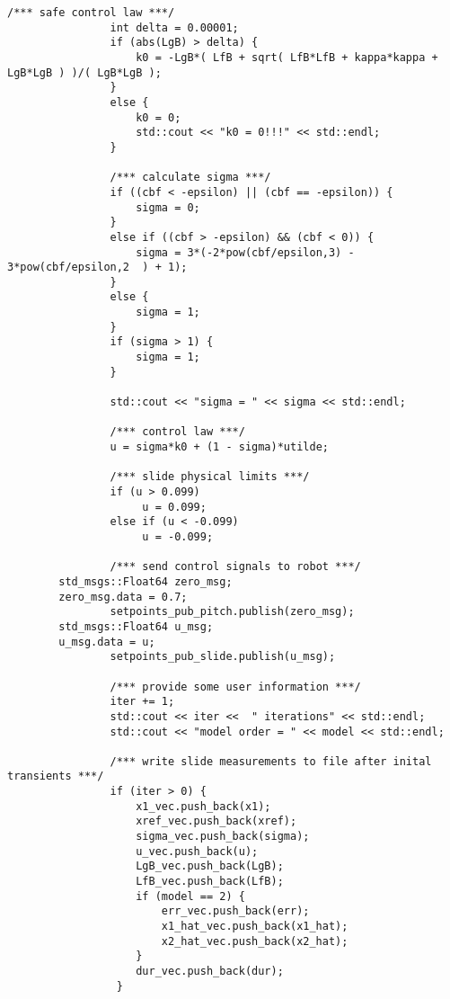 \begin{lstlisting}[language=gedit]
                /*** safe control law ***/
                int delta = 0.00001;
                if (abs(LgB) > delta) {
                    k0 = -LgB*( LfB + sqrt( LfB*LfB + kappa*kappa + LgB*LgB ) )/( LgB*LgB );
                }
                else {
                    k0 = 0;
                    std::cout << "k0 = 0!!!" << std::endl;
                }          
 
                /*** calculate sigma ***/
                if ((cbf < -epsilon) || (cbf == -epsilon)) {
                    sigma = 0;
                }
                else if ((cbf > -epsilon) && (cbf < 0)) {
                    sigma = 3*(-2*pow(cbf/epsilon,3) - 3*pow(cbf/epsilon,2	) + 1);
                }
                else {
                    sigma = 1;
                }
                if (sigma > 1) {
                    sigma = 1;
                }
               
                std::cout << "sigma = " << sigma << std::endl;

                /*** control law ***/
                u = sigma*k0 + (1 - sigma)*utilde;

                /*** slide physical limits ***/
                if (u > 0.099)
                     u = 0.099;
                else if (u < -0.099)
                     u = -0.099;
                
                /*** send control signals to robot ***/
		std_msgs::Float64 zero_msg;
		zero_msg.data = 0.7;
                setpoints_pub_pitch.publish(zero_msg);
		std_msgs::Float64 u_msg;
		u_msg.data = u;
                setpoints_pub_slide.publish(u_msg);

                /*** provide some user information ***/
                iter += 1;
                std::cout << iter <<  " iterations" << std::endl;
                std::cout << "model order = " << model << std::endl;

                /*** write slide measurements to file after inital transients ***/
                if (iter > 0) {
                    x1_vec.push_back(x1);
                    xref_vec.push_back(xref);
                    sigma_vec.push_back(sigma);
                    u_vec.push_back(u);
                    LgB_vec.push_back(LgB);
                    LfB_vec.push_back(LfB);
                    if (model == 2) {
                        err_vec.push_back(err);
                        x1_hat_vec.push_back(x1_hat);
                        x2_hat_vec.push_back(x2_hat);
                    }
                    dur_vec.push_back(dur);
                 }


\end{lstlisting}
